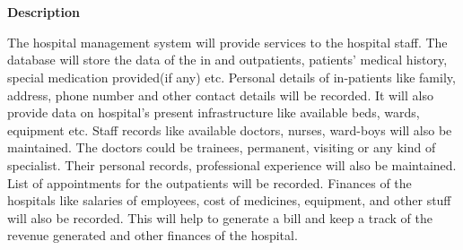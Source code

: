 \documentclass{turabian-researchpaper}
\begin{document}
\section{}
\begin{flushleft}
\textbf{\large Description}
\end{flushleft}
The hospital management system will provide services to the hospital staff.  The database will store the data of the in and outpatients, patients’ medical history, special medication provided(if any) etc.  Personal details of in-patients like family, address, phone number and other contact details will be recorded.   It  will also provide data on hospital’s present infrastructure like available beds, wards, equipment etc.  Staff records like available doctors, nurses, ward-boys will also be maintained.  The doctors could be trainees, permanent, visiting or any kind of specialist.  Their personal records, professional experience will also be maintained.   List  of appointments for the outpatients will be recorded.   Finances of the hospitals like salaries of employees, cost of medicines, equipment, and other stuff will also be recorded.  This will help to generate a bill and keep a track of the revenue generated and other finances of the hospital.\\\\\\\

\vspace{5cm}
\end{document}
